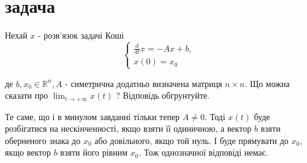 
\section{задача}
\begin{tcolorbox}[title=Умова]
Нехай $x$ - розв'язок задачі Коші
$$
\left\{\begin{array}{l}
\frac{d}{d t} x=-A x+b, \\
x(0)=x_0
\end{array}\right.
$$

де $b, x_0 \in \mathbb{R}^n, A$ - симетрична додатньо визначена матриця $n \times n$. Що можна сказати про $\lim _{t \rightarrow+\infty} x(t)$ ? Відповідь обгрунтуйте.

\end{tcolorbox}


Те саме, що і в минулом завданні тільки тепер $A \neq 0$. Тоді $x(t)$ буде розбігатися на нескінченності, якщо взяти її одиничною, а вектор $b$ взяти оберненого знака до 
$x_0$ або довільного, якщо той нуль. І буде прямувати до $x_0$, якщо вектор $b$ взяти 
його рівним $x_0$. Тож однозначної відповіді немає.